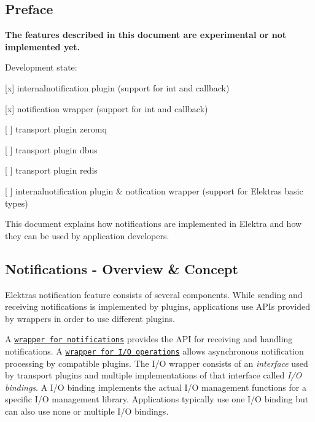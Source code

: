 \subsection*{Preface}

{\bfseries The features described in this document are experimental or not implemented yet.}

Development state\+:


\begin{DoxyItemize}
\item \mbox{[}x\mbox{]} internalnotification plugin (support for int and callback)
\item \mbox{[}x\mbox{]} notification wrapper (support for int and callback)
\item \mbox{[} \mbox{]} transport plugin zeromq
\item \mbox{[} \mbox{]} transport plugin dbus
\item \mbox{[} \mbox{]} transport plugin redis
\item \mbox{[} \mbox{]} internalnotification plugin \& notfication wrapper (support for Elektra\textquotesingle{}s basic types)
\end{DoxyItemize}

This document explains how notifications are implemented in Elektra and how they can be used by application developers.

\subsection*{Notifications -\/ Overview \& Concept}

Elektra\textquotesingle{}s notification feature consists of several components. While sending and receiving notifications is implemented by plugins, applications use A\+P\+Is provided by wrappers in order to use different plugins.

A \href{https://doc.libelektra.org/api/current/html/group__kdbnotification.html}{\tt wrapper for notifications} provides the A\+PI for receiving and handling notifications. A \href{https://doc.libelektra.org/api/current/html/group__kdbio.html}{\tt wrapper for I/O operations} allows asynchronous notification processing by compatible plugins. The I/O wrapper consists of an {\itshape interface} used by transport plugins and multiple implementations of that interface called {\itshape I/O bindings}. A I/O binding implements the actual I/O management functions for a specific I/O management library. Applications typically use one I/O binding but can also use none or multiple I/O bindings.

